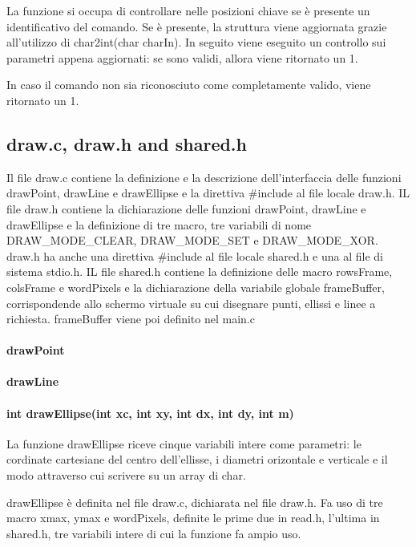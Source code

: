 \documentclass[a4paper]{article}
\begin{document}
			La funzione si occupa di controllare nelle posizioni chiave se è presente un identificativo del comando.
			Se è presente, la struttura viene aggiornata grazie all'utilizzo di char2int(char charIn).
			In seguito viene eseguito un controllo sui parametri appena aggiornati: se sono validi, allora viene
			ritornato un 1.

			In caso il comando non sia riconosciuto come completamente valido, viene ritornato un 1.
      \subsection{draw.c, draw.h and shared.h}
      Il file draw.c contiene la definizione e la descrizione dell'interfaccia delle funzioni drawPoint, drawLine e drawEllipse e la direttiva \#include al file locale draw.h.
      IL file draw.h contiene la dichiarazione delle funzioni drawPoint, drawLine e drawEllipse e la definizione di tre macro, tre variabili di nome DRAW\_MODE\_CLEAR, DRAW\_MODE\_SET e DRAW\_MODE\_XOR.
      draw.h ha anche una direttiva \#include al file locale shared.h e una al file di sistema stdio.h.
      IL file shared.h contiene la definizione delle macro rowsFrame, colsFrame e wordPixels e la dichiarazione della variabile globale frameBuffer,
      corrispondende allo schermo virtuale su cui disegnare punti, ellissi e linee a richiesta. frameBuffer viene poi definito nel main.c
		\paragraph{drawPoint}
		\paragraph{drawLine}
		\paragraph{int drawEllipse(int xc, int xy, int dx, int dy, int m)}
		La funzione drawEllipse riceve cinque variabili intere come parametri:
                le cordinate cartesiane del centro dell'ellisse, i diametri orizontale e verticale e il modo attraverso cui scrivere su un array di char.
		
		drawEllipse è definita nel file draw.c, dichiarata nel file draw.h.
                Fa uso di tre macro xmax, ymax e wordPixels, definite le prime due in read.h, l'ultima in shared.h, tre variabili intere di cui la funzione fa ampio uso.
		
\end{document}
